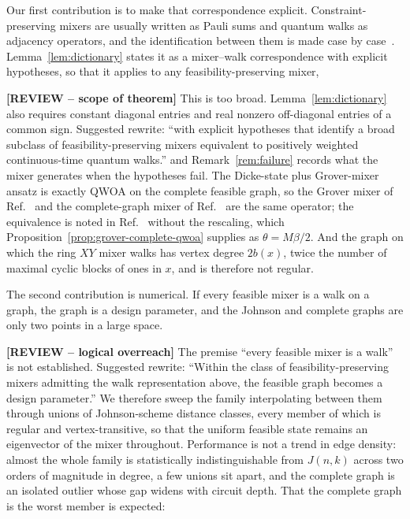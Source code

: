 Our first contribution is to make that correspondence explicit.
Constraint-preserving mixers are usually written as Pauli sums and quantum
walks as adjacency operators, and the identification between them is made case
by case~\cite{Marsh2019,Marsh2020,Slate2021,Bartschi2020,Fuchs2022,%
Matwiejew2024}. Lemma~\ref{lem:dictionary} states it as a mixer--walk correspondence with
explicit hypotheses, so that it applies to any feasibility-preserving mixer,

{\color{red}\textbf{[REVIEW -- scope of theorem]} This is too broad. Lemma~\ref{lem:dictionary} also requires constant diagonal entries and real nonzero off-diagonal entries of a common sign. Suggested rewrite: ``with explicit hypotheses that identify a broad subclass of feasibility-preserving mixers equivalent to positively weighted continuous-time quantum walks.''}
and Remark~\ref{rem:failure} records what the mixer generates when the
hypotheses fail. The
Dicke-state plus Grover-mixer ansatz is exactly QWOA on the complete feasible
graph, so the Grover mixer of Ref.~\cite{Bartschi2020} and the complete-graph
mixer of Ref.~\cite{Slate2021} are the same operator; the equivalence is noted
in Ref.~\cite{Bridi2024} without the rescaling, which
Proposition~\ref{prop:grover-complete-qwoa} supplies as $\theta=M\beta/2$. And
the graph on which the ring
$XY$ mixer walks has vertex degree $2b(x)$, twice the number of maximal cyclic
blocks of ones in $x$, and is therefore not regular.

The second contribution is numerical. If every feasible mixer is a walk on a
graph, the graph is a design parameter, and the Johnson and complete graphs
are only two points in a large space.

{\color{red}\textbf{[REVIEW -- logical overreach]} The premise ``every feasible mixer is a walk'' is not established. Suggested rewrite: ``Within the class of feasibility-preserving mixers admitting the walk representation above, the feasible graph becomes a design parameter.''} We therefore sweep the family
interpolating between them through unions of Johnson-scheme distance classes,
every member of which is regular and vertex-transitive, so that the uniform
feasible state remains an eigenvector of the mixer throughout. Performance is
not a trend in edge density: almost the whole family is statistically
indistinguishable from $J(n,k)$ across two orders of magnitude in degree, a
few unions sit apart, and the complete graph is an isolated outlier whose gap
widens with circuit depth.
That the complete graph is the worst member is expected:

